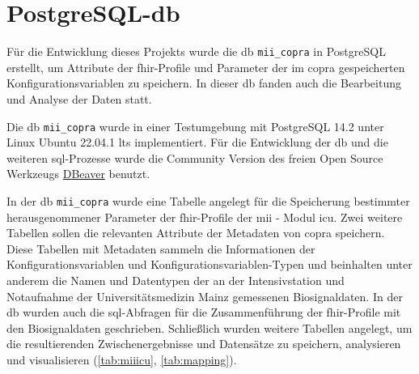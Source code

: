 \section{PostgreSQL-\acs{db}} \label{sec:database}

Für die Entwicklung dieses Projekts wurde die \ac{db} \texttt{mii\_copra} in PostgreSQL erstellt, um Attribute der \ac{fhir}-Profile und Parameter der im \ac{copra} gespeicherten Konfigurationsvariablen zu speichern. In dieser \ac{db} fanden auch die Bearbeitung und Analyse der Daten statt.

Die \ac{db} \texttt{mii\_copra} wurde in einer Testumgebung mit PostgreSQL 14.2 unter Linux Ubuntu 22.04.1 \ac{lts} implementiert. Für die Entwicklung der \ac{db} und die weiteren \ac{sql}-Prozesse wurde die Community Version des freien Open Source Werkzeugs \href{https://dbeaver.io/}{DBeaver} benutzt.

In der \ac{db} \texttt{mii\_copra} wurde eine Tabelle angelegt für die Speicherung bestimmter herausgenommener Parameter der \ac{fhir}-Profile der \ac{mii} - Modul \glqq\ac{icu}\grqq{}. Zwei weitere Tabellen sollen die relevanten Attribute der Metadaten von \ac{copra} speichern. Diese Tabellen mit Metadaten 
sammeln die Informationen der Konfigurationsvariablen und Konfigurationsvariablen-Typen und beinhalten unter anderem die Namen und Datentypen der an der Intensivstation und Notaufnahme der Universitätsmedizin Mainz gemessenen Biosignaldaten. In der \ac{db} wurden auch die \ac{sql}-Abfragen für die Zusammenführung der \ac{fhir}-Profile mit den Biosignaldaten geschrieben. Schließlich wurden weitere Tabellen angelegt, um die resultierenden Zwischenergebnisse und Datensätze zu speichern, analysieren und visualisieren (\ref{tab:miiicu}, \ref{tab:mapping}).
